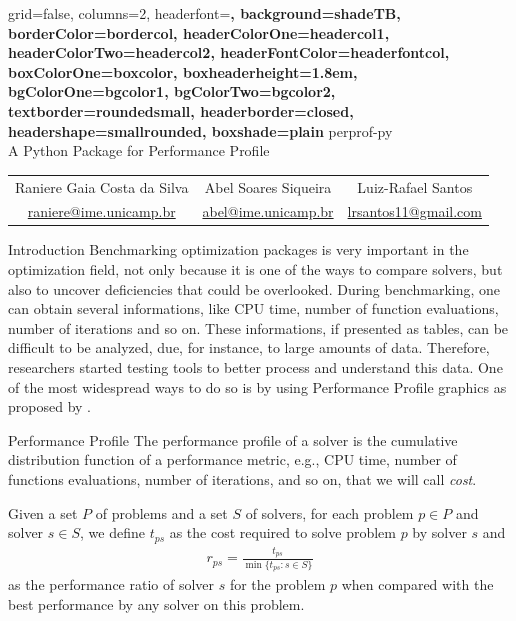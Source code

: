 \documentclass[a0paper,portrait]{baposter}
\begin{document}
\begin{poster}
  {
    grid=false,
    columns=2,
    headerfont=\Large\sf\bf,
    background=shadeTB,
    borderColor=bordercol,
    headerColorOne=headercol1,
    headerColorTwo=headercol2,
    headerFontColor=headerfontcol,
    boxColorOne=boxcolor,
    boxheaderheight=1.8em,
    bgColorOne=bgcolor1,
    bgColorTwo=bgcolor2,
    textborder=roundedsmall,
    headerborder=closed,
    headershape=smallrounded,
    boxshade=plain
  }
  {
 \unicamplogol
  }
  {
    perprof-py \vspace{2pt} \\ A Python Package for Performance Profile
  }
  {
    \begin{tabular}{ccc}
      Raniere Gaia Costa da Silva &
      Abel Soares Siqueira &
      Luiz-Rafael Santos \\
      \url{raniere@ime.unicamp.br} &
      \url{abel@ime.unicamp.br} &
      \url{lrsantos11@gmail.com}
    \end{tabular}
  }
  {
  }

  \linespread{1.1}

  \begin{posterbox}[column=0]{Introduction}
    Benchmarking optimization packages is very important in the optimization
    field, not only because it is one of the ways to compare solvers, but also
    to uncover deficiencies that could be overlooked. During benchmarking, one
    can obtain several informations, like CPU time, number of function
    evaluations, number of iterations and so on. These informations, if
    presented as tables, can be difficult to be analyzed, due, for instance,
    to large amounts of data. Therefore, researchers started testing tools to
    better process and understand this data.  One of the most widespread ways
    to do so is by using Performance Profile graphics as proposed by
    \textcite{Dolan2002}.
  \end{posterbox}

  \begin{posterbox}[column=0,below=auto]{Performance Profile}
    The performance profile of a solver is the cumulative distribution
    function of a performance metric, e.g., CPU time, number of functions
    evaluations, number of iterations, and so on, that we will call \emph{cost}.

    Given a set $P$ of problems and a set $S$ of solvers, for each problem $p
    \in P$ and solver $s \in S$, we define $t_{ps}$ as the cost
    required to solve problem $p$ by solver $s$ and
    \begin{align*}
      r_{ps} = \frac{t_{ps}}{\min\{t_{ps}: s \in S\}}
    \end{align*}
    as the performance ratio of solver $s$ for the problem $p$ when compared
    with the best performance by any solver on this problem.


\end{posterbox}
\end{poster}
\end{document}
